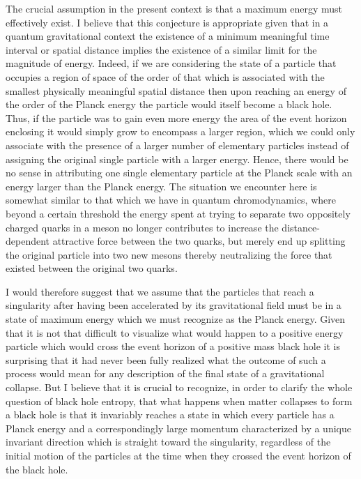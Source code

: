 \documentclass[notitlepage,12pt]{report}
\begin{document}
The crucial assumption in the present context is that a maximum energy must effectively exist. I believe that this conjecture is appropriate given that in a quantum gravitational context the existence of a minimum meaningful time interval or spatial distance implies the existence of a similar limit for the magnitude of energy. Indeed, if we are considering the state of a particle that occupies a region of space of the order of that which is associated with the smallest physically meaningful spatial distance then upon reaching an energy of the order of the Planck energy the particle would itself become a black hole. Thus, if the particle was to gain even more energy the area of the event horizon enclosing it would simply grow to encompass a larger region, which we could only associate with the presence of a larger number of elementary particles instead of assigning the original single particle with a larger energy. Hence, there would be no sense in attributing one single elementary particle at the Planck scale with an energy larger than the Planck energy. The situation we encounter here is somewhat similar to that which we have in quantum chromodynamics, where beyond a certain threshold the energy spent at trying to separate two oppositely charged quarks in a meson no longer contributes to increase the distance-dependent attractive force between the two quarks, but merely end up splitting the original particle into two new mesons thereby neutralizing the force that existed between the original two quarks.

I would therefore suggest that we assume that the particles that reach a singularity after having been accelerated by its gravitational field must be in a state of maximum energy which we must recognize as the Planck energy. Given that it is not that difficult to visualize what would happen to a positive energy particle which would cross the event horizon of a positive mass black hole it is surprising that it had never been fully realized what the outcome of such a process would mean for any description of the final state of a gravitational collapse. But I believe that it is crucial to recognize, in order to clarify the whole question of black hole entropy, that what happens when matter collapses to form a black hole is that it invariably reaches a state in which every particle has a Planck energy and a correspondingly large momentum characterized by a unique invariant direction which is straight toward the singularity, regardless of the initial motion of the particles at the time when they crossed the event horizon of the black hole.
\end{document}
